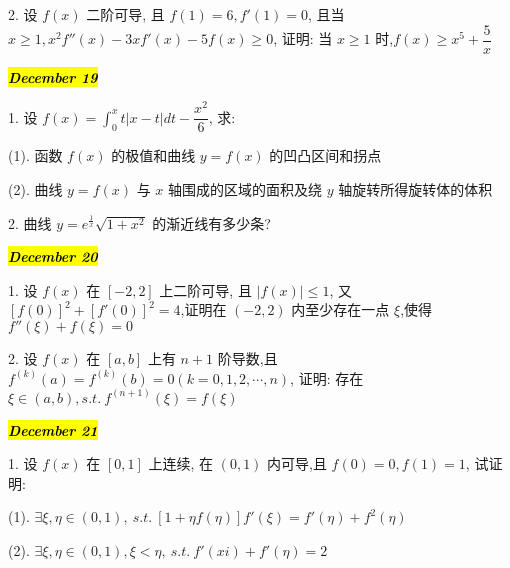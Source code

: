 2. 设 $f(x)$ 二阶可导, 且 $f(1)=6,f'(1)=0$, 且当 $x\geq 1, x^{2}f''(x)-3xf'(x)-5f(x)\geq 0$, 证明: 当 $x\geq 1$ 时,$f(x)\geq x^{5}+\dfrac{5}{x}$
\begin{solution}
	
\end{solution}

\hl{\textbf{\textit{December 19}}}

1. 设 $f(x)=\int_{0}^{x}t|x-t|dt-\dfrac{x^{2}}{6}$, 求:

(1). 函数 $f(x)$ 的极值和曲线 $y=f(x)$ 的凹凸区间和拐点

(2). 曲线 $y=f(x)$ 与 $x$ 轴围成的区域的面积及绕 $y$ 轴旋转所得旋转体的体积
\begin{solution}
	
\end{solution}

2. 曲线 $y=e^{\frac{1}{x}}\sqrt{1+x^{2}}$ 的渐近线有多少条?
\begin{solution}
	
\end{solution}

\hl{\textbf{\textit{December 20}}}

1. 设 $f(x)$ 在 $[-2,2]$ 上二阶可导, 且 $|f(x)|\leq 1$, 又 $[f(0)]^{2}+[f'(0)]^{2}=4$,证明在 $(-2,2)$ 内至少存在一点 $\xi$,使得 $f''(\xi)+f(\xi)=0$
\begin{solution}
	
\end{solution}

2. 设 $f(x)$ 在 $[a,b]$ 上有 $n+1$ 阶导数,且 $f^{(k)}(a)=f^{(k)}(b)=0 (k=0,1,2,\cdots,n)$, 证明: 存在 $\xi\in(a,b),s.t.\ f^{(n+1)}(\xi)=f(\xi)$
\begin{solution}
	
\end{solution}

\hl{\textbf{\textit{December 21}}}

1. 设 $f(x)$ 在 $[0,1]$ 上连续, 在 $(0,1)$ 内可导,且 $f(0)=0,f(1)=1$, 试证明:

(1). $\exists \xi,\eta\in(0,1),\ s.t.\ [1+\eta f(\eta)] f'(\xi)= f'(\eta)+f^{2}(\eta)$

(2). $\exists \xi,\eta\in(0,1),\xi < \eta,\ s.t.\ f'(xi)+f'(\eta)=2$
\begin{solution}
	
\end{solution}


